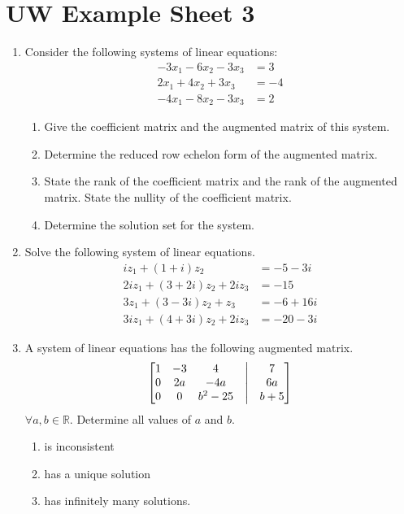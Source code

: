 \documentclass{report}
\newcommand{\R}{{\mathbb{R}}}
\begin{document}
\chapter*{UW Example Sheet 3}
\begin{enumerate}
    \item Consider the following systems of linear equations:
    \begin{align*}
        -3x_1 - 6x_2 - 3x_3 &= 3\\
        2x_1 + 4x_2 + 3x_3 &= -4\\
        -4x_1 - 8x_2 - 3x_3 &= 2
    \end{align*}
    \begin{enumerate}
        \item Give the coefficient matrix and the augmented matrix of this system.
        \item Determine the reduced row echelon form of the augmented matrix.
        \item State the rank of the coefficient matrix and the rank of the augmented matrix. State the nullity of the coefficient matrix.
        \item Determine the solution set for the system.
    \end{enumerate}
    \item Solve the following system of linear equations.
    \begin{align*}
        iz_1 + (1+i)z_2 &= -5 - 3i\\
        2iz_1 + (3 + 2i)z_2 + 2iz_3 &= -15\\
        3z_1 + (3 - 3i)z_2 + z_3 &= -6 + 16i\\
        3iz_1 + (4 + 3i)z_2 + 2iz_3 &= -20 - 3i
    \end{align*}
    \item A system of linear equations has the following augmented matrix.
    $$\begin{bmatrix}
    1 & -3 & 4 &\bigm| & 7\\
    0 & 2a & -4a &\bigm| & 6a\\
    0 & 0 & b^2 - 25 &\bigm| &b+5
    \end{bmatrix}$$
    $\forall a,b \in \R$. Determine all values of $a$ and $b$.
    \begin{enumerate}
        \item is inconsistent
        \item has a unique solution
        \item has infinitely many solutions.
    \end{enumerate}

\end{enumerate}
\end{document}
